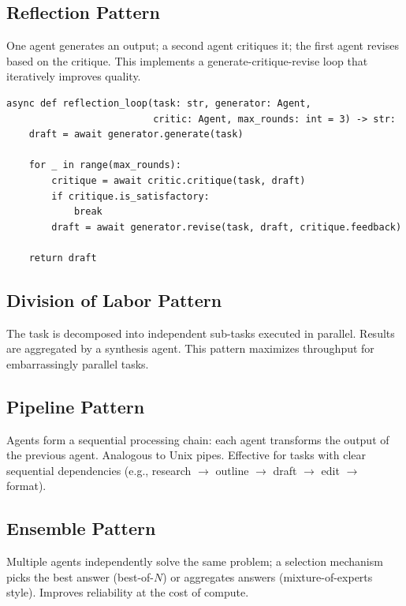 \subsection{Reflection Pattern}
\label{reflection-pattern}

One agent generates an output; a second agent critiques it; the first agent revises based on the critique. This implements a generate-critique-revise loop that iteratively improves quality.

\begin{lstlisting}[style=pythonstyle, caption={Reflection pattern}]
async def reflection_loop(task: str, generator: Agent,
                          critic: Agent, max_rounds: int = 3) -> str:
    draft = await generator.generate(task)

    for _ in range(max_rounds):
        critique = await critic.critique(task, draft)
        if critique.is_satisfactory:
            break
        draft = await generator.revise(task, draft, critique.feedback)

    return draft
\end{lstlisting}

\subsection{Division of Labor Pattern}
\label{division-of-labor-pattern}

The task is decomposed into independent sub-tasks executed in parallel. Results are aggregated by a synthesis agent. This pattern maximizes throughput for embarrassingly parallel tasks.

\subsection{Pipeline Pattern}
\label{pipeline-pattern}

Agents form a sequential processing chain: each agent transforms the output of the previous agent. Analogous to Unix pipes. Effective for tasks with clear sequential dependencies (e.g., research $\to$ outline $\to$ draft $\to$ edit $\to$ format).

\subsection{Ensemble Pattern}
\label{ensemble-pattern}

Multiple agents independently solve the same problem; a selection mechanism picks the best answer (best-of-$N$) or aggregates answers (mixture-of-experts style). Improves reliability at the cost of compute.

